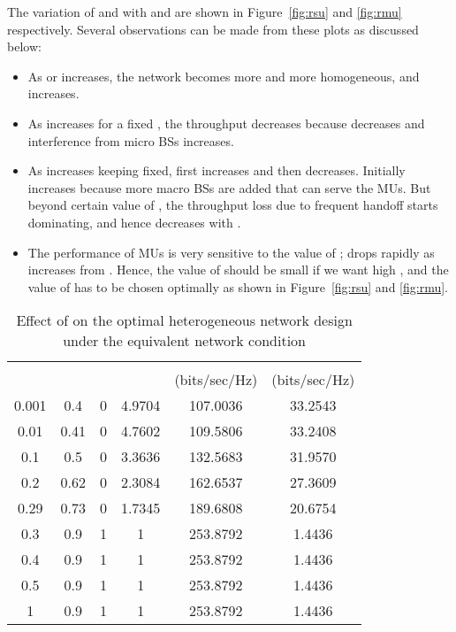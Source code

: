 \documentclass[10pt,journal]{IEEEtran}
\begin{document}
The variation of  and  with  and  are shown in 
Figure~\ref{fig:rsu} and \ref{fig:rmu} respectively. Several observations can be made 
from these plots as discussed below:
\begin{itemize}
\item As  or  increases, the network becomes more and more homogeneous, and  increases.
\item As  increases for a fixed , the throughput  decreases because  decreases and 
interference from micro BSs increases.
\item As  increases keeping  fixed,  first increases and then decreases. Initially  
increases because more macro BSs are added that can serve the MUs. But beyond certain value of , the throughput loss 
due to frequent handoff starts dominating, and hence  decreases with .
\item The performance of MUs is very sensitive to the value of ;  drops rapidly as  
increases from . Hence, the value of  should be small if we want high , and the value of  has to be 
chosen optimally as shown in Figure~\ref{fig:rsu} and \ref{fig:rmu}.
\end{itemize}




\begin{table}[t!]
\centering
\footnotesize
\begin{tabular}{|c |c |c|c|c|c|}
\hline
                 &  &  &  &   &    \\ 
                      &       &                       &                       & (bits/sec/Hz)  &   (bits/sec/Hz)                    \\ \hline
0.001    & 0.4 & 0 & 4.9704  & 107.0036  & 33.2543 \\ \hline
0.01     & 0.41 & 0 & 4.7602 & 109.5806 & 33.2408 \\ \hline
0.1     & 0.5 & 0 & 3.3636 & 132.5683 & 31.9570 \\ \hline
0.2     & 0.62 & 0 & 2.3084 & 162.6537 &  27.3609 \\ \hline
0.29        &   0.73    &  0  &  1.7345  &  189.6808  &  20.6754  \\ \hline
0.3     &  0.9 & 1 & 1 & 253.8792 & 1.4436 \\ \hline
0.4     &  0.9 & 1 & 1 & 253.8792 & 1.4436 \\ \hline
0.5     &  0.9 & 1 & 1 & 253.8792 & 1.4436 \\ \hline
1     &  0.9 & 1 & 1 & 253.8792 & 1.4436 \\ \hline
 \end{tabular}
 \normalsize
\caption{Effect of  on the optimal heterogeneous network design under the equivalent network condition}
\label{table:unbounded-and-bounded-power}
\end{table}
\end{document}
